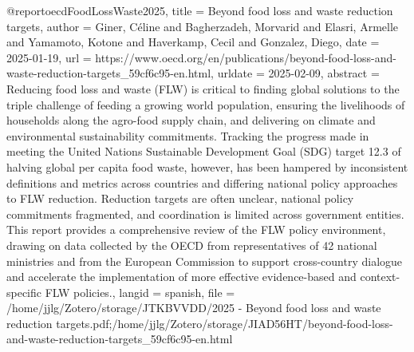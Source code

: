 {{{@report{oecdFoodLossWaste2025,
  title = {Beyond food loss and waste reduction targets},
  author = {Giner, Céline and Bagherzadeh, Morvarid and Elasri, Armelle and Yamamoto, Kotone and Haverkamp, Cecil and Gonzalez, Diego},
  date = {2025-01-19},
  url = {https://www.oecd.org/en/publications/beyond-food-loss-and-waste-reduction-targets_59cf6c95-en.html},
  urldate = {2025-02-09},
  abstract = {Reducing food loss and waste (FLW) is critical to finding global solutions to the triple challenge of feeding a growing world population, ensuring the livelihoods of households along the agro-food supply chain, and delivering on climate and environmental sustainability commitments. Tracking the progress made in meeting the United Nations Sustainable Development Goal (SDG) target 12.3 of halving global per capita food waste, however, has been hampered by inconsistent definitions and metrics across countries and differing national policy approaches to FLW reduction. Reduction targets are often unclear, national policy commitments fragmented, and coordination is limited across government entities. This report provides a comprehensive review of the FLW policy environment, drawing on data collected by the OECD from representatives of 42 national ministries and from the European Commission to support cross-country dialogue and accelerate the implementation of more effective evidence-based and context-specific FLW policies.},
  langid = {spanish},
  file = {/home/jjlg/Zotero/storage/JTKBVVDD/2025 - Beyond food loss and waste reduction targets.pdf;/home/jjlg/Zotero/storage/JIAD56HT/beyond-food-loss-and-waste-reduction-targets_59cf6c95-en.html}
}

}}}
